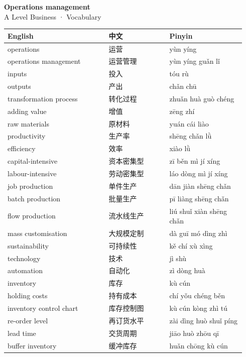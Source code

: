 \documentclass[11pt]{article}
\begin{document}
\begin{center}
  {\LARGE\bfseries Operations management}\\[0.35em]
  {\large A Level Business · Vocabulary}
\end{center}
\vspace{0.6em}

\begin{longtable}{@{}p{0.40\linewidth}p{0.24\linewidth}p{0.30\linewidth}@{}}
\toprule
\textbf{English} & \textbf{中文} & \textbf{Pinyin} \\
\midrule
\endhead
\bottomrule
\endlastfoot
operations & 运营 & yùn yíng \\
operations management & 运营管理 & yùn yíng guǎn lǐ \\
inputs & 投入 & tóu rù \\
outputs & 产出 & chǎn chū \\
transformation process & 转化过程 & zhuǎn huà guò chéng \\
adding value & 增值 & zēng zhí \\
raw materials & 原材料 & yuán cái liào \\
productivity & 生产率 & shēng chǎn lǜ \\
efficiency & 效率 & xiào lǜ \\
capital-intensive & 资本密集型 & zī běn mì jí xíng \\
labour-intensive & 劳动密集型 & láo dòng mì jí xíng \\
job production & 单件生产 & dān jiàn shēng chǎn \\
batch production & 批量生产 & pī liàng shēng chǎn \\
flow production & 流水线生产 & liú shuǐ xiàn shēng chǎn \\
mass customisation & 大规模定制 & dà guī mó dìng zhì \\
sustainability & 可持续性 & kě chí xù xìng \\
technology & 技术 & jì shù \\
automation & 自动化 & zì dòng huà \\
inventory & 库存 & kù cún \\
holding costs & 持有成本 & chí yǒu chéng běn \\
inventory control chart & 库存控制图 & kù cún kòng zhì tú \\
re-order level & 再订货水平 & zài dìng huò shuǐ píng \\
lead time & 交货周期 & jiāo huò zhōu qī \\
buffer inventory & 缓冲库存 & huǎn chōng kù cún \\

\end{longtable}
\end{document}

